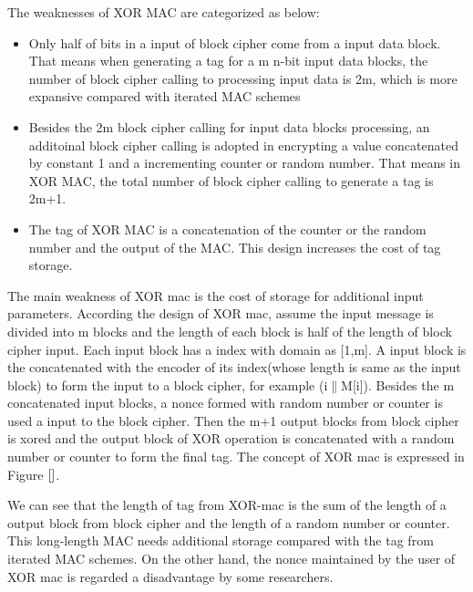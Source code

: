 \documentclass{article}
\begin{document}
The weaknesses of XOR MAC are categorized as below:
\begin{itemize}
	\item Only half of bits in a input of block cipher come from a input data block. That means when generating a tag for a m n-bit input data blocks, the number of block cipher calling to processing input data is 2m, which is more expansive compared with iterated MAC schemes 
	\item Besides the 2m block cipher calling for input data blocks processing, an additoinal block cipher calling is adopted in encrypting a value concatenated by constant 1 and a incrementing counter or random number. That means in XOR MAC, the total number of block cipher calling to generate a tag is 2m+1. 
	\item The tag of XOR MAC is a concatenation of the counter or the random number and the output of the MAC. This design increases the cost of tag storage.
\end{itemize}

The main weakness of XOR mac is the cost of storage for additional input parameters. According the design of XOR mac, assume the input message is divided into m blocks and the length of each block is half of the length of block cipher input. Each input block has a index with domain as [1,m]. A input block is the concatenated with the encoder of its index(whose length is same as the input block) to form the input to a block cipher, for example (i$\|$M[i]). Besides the m concatenated input blocks, a nonce formed with random number or counter is used a input to the block cipher. Then the m+1 output blocks from block cipher is xored and the output block of XOR operation is concatenated with a random number or counter to form the final tag. The concept of XOR mac is expressed in Figure $\ref{}$. 

We can see that the length of tag from XOR-mac is the sum of the length of a output block from block cipher and the length of a random number or counter. This long-length MAC needs additional storage compared with the tag from iterated MAC schemes. 
On the other hand, the nonce maintained by the user of XOR mac is regarded a disadvantage by some researchers.

\end{document}
